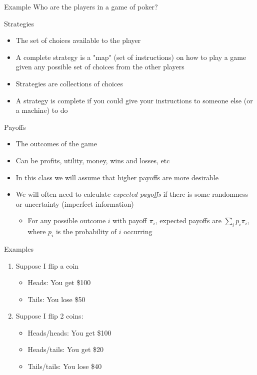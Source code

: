 \documentclass[10pt]{beamer}
\begin{document}
\begin{frame}[label={sec:orga97e7ad}]{}
\alert{Example}
Who are the players in a game of poker?
\end{frame}

\begin{frame}[label={sec:org5096f7e}]{}
\alert{Strategies}
\begin{itemize}
\item The set of choices available to the player
\item A complete strategy is a "map" (set of instructions) on how to play a game given any possible set of choices from the other players
\item Strategies are collections of choices
\item A strategy is complete if you could give your instructions to someone else (or a machine) to do
\end{itemize}
\end{frame}

\begin{frame}[label={sec:org58d3b0c}]{}
\alert{Payoffs}
\begin{itemize}
\item The outcomes of the game
\item Can be profits, utility, money, wins and losses, etc
\item In this class we will assume that higher payoffs are more desirable
\item We will often need to calculate \emph{expected payoffs} if there is some randomness or uncertainty (imperfect information)
\begin{itemize}
\item For any possible outcome \(i\) with payoff \(\pi_i\), expected payoffs are \(\sum_i p_i \pi_i\), where \(p_i\) is the probability of \(i\) occurring
\end{itemize}
\end{itemize}
\end{frame}
\begin{frame}[label={sec:orgaabec53}]{}
\alert{Examples}
\begin{enumerate}
\item Suppose I flip a coin
\begin{itemize}
\item Heads: You get \$100
\item Tails: You lose \$50
\end{itemize}
\item Suppose I flip 2 coins:
\begin{itemize}
\item Heads/heads: You get \$100
\item Heads/tails: You get \$20
\item Tails/tails: You lose \$40
\end{itemize}
\end{enumerate}
\end{frame}
\end{document}
